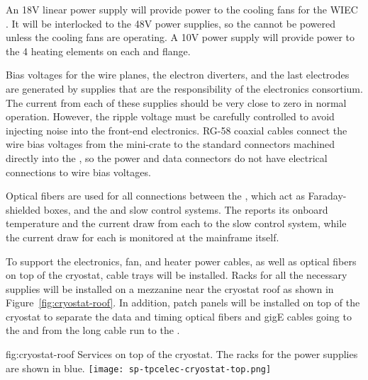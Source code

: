 An 18V linear power supply will provide power to the cooling fans for the WIEC . It will be interlocked to the 48V power 
supplies, so the  cannot be powered unless the cooling fans are operating. A 10V power supply will provide
power to the 4 heating elements on each  and  flange.

Bias voltages for the  wire planes, the electron diverters, and the last  electrodes are generated 
by supplies that are the responsibility of the  electronics consortium.  The current from each of these supplies 
should be very close to zero in normal operation.  However, the ripple voltage must be carefully controlled to 
avoid injecting noise into the front-end electronics.  RG-58 coaxial cables connect the wire bias voltages from the 
mini-crate to the standard  connectors machined directly into the  \fdth, so the  power and data connectors do not have electrical connections to wire bias voltages.

Optical fibers are used for all connections between the , which act as
Faraday-shielded boxes, and the  and slow control systems.  The  reports
its onboard temperature and the current draw from each  to the slow control system, while the
current draw for each  is monitored at the mainframe itself.

To support the electronics, fan, and heater power cables, as well as optical fibers on top of the cryostat, 
cable trays will be installed. Racks for all the necessary  supplies will be installed on a mezzanine
near the cryostat roof as shown in Figure~\ref{fig:cryostat-roof}.
In addition, patch panels will be installed on top of the cryostat to separate the data and timing optical fibers and gigE
cables going to the  and  from the long cable run to the .

\begin{dunefigure}
{fig:cryostat-roof}
{Services on top of the cryostat. The racks for the  power supplies are shown in blue.}
\texttt{[image: sp-tpcelec-cryostat-top.png]}
\end{dunefigure}
